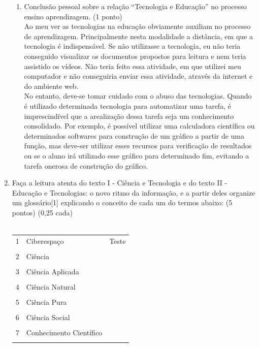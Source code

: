 \documentclass[a4paper, 12pt]{article}
\begin{document}
\begin{enumerate}
\begin{enumerate}
  \item Conclusão pessoal sobre a relação “Tecnologia e Educação” no processo ensino aprendizagem. (1 ponto) \\
    Ao meu ver as tecnologias na educação obviamente auxiliam no processo de aprendizagem. Principalmente nesta modalidade a distância, em que a tecnologia é indispensável. Se não utilizasse a tecnologia, eu não teria conseguido visualizar os documentos propostos para leitura e nem teria assistido os vídeos. Não teria feito essa atividade, em que utilizei meu computador e não conseguiria enviar essa atividade, através da internet e do ambiente web. \\
    No entanto, deve-se tomar cuidado com o abuso das tecnologias. Quando é utilizado determinada tecnologia para automatizar uma tarefa, é imprescindível que a arealização dessa tarefa seja um conhecimento consolidado. Por exemplo, é possível utilizar uma calculadora científica ou determinados softwares para construção de um gráfico a partir de uma função, mas deve-ser utilizar esses recursos para verificação de resultados ou se o aluno irá utilizado esse gráfico para determinado fim, evitando a tarefa onerosa de construção do gráfico.
  \end{enumerate}
  \item Faça a leitura atenta do texto I  - Ciência e  Tecnologia e   do texto II -  Educação e Tecnologias: o novo ritmo da informação,   e a partir deles organize um glossário[1] explicando o conceito de cada um do termos abaixo: (5 pontos) (0,25 cada) \\ \\
    \begin{tabular}{|m{0.5cm}|m{5cm}|m{8cm}|}
      \hline
      1 & Ciberespaço & Teste \\ \\
      \hline
      2 & Ciência & \\ \\
      \hline
      3 & Ciência Aplicada & \\ \\
      \hline
      4 & Ciência Natural & \\ \\
      \hline
      5 & Ciência Pura & \\ \\
      \hline
      6 & Ciência Social & \\ \\
      \hline
      7 & Conhecimento Científico & \\ \\

\end{tabular}
\end{enumerate}
\end{document}
